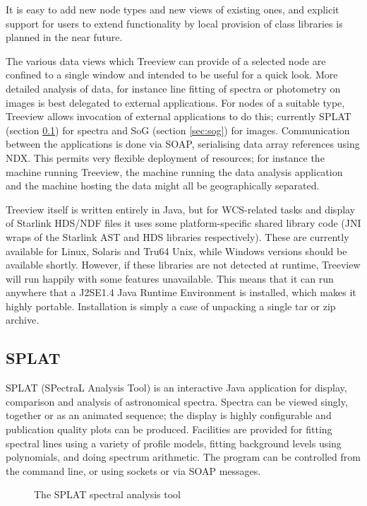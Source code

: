 It is easy to add new node types and new views of existing ones, 
and explicit support for users to extend functionality by local 
provision of class libraries is planned in the near future.

The various data views which Treeview can provide of a selected node
are confined to a single window and intended to be useful for a quick look.
More detailed analysis of data, for instance 
line fitting of spectra
or
photometry on images 
is best delegated to external applications.
For nodes of a suitable type, Treeview allows invocation of 
external applications to do this; currently 
SPLAT (section \ref{sec:splat}) for spectra
and
SoG (section \ref{sec:sog}) for images.
Communication between the applications is done via SOAP, 
serialising data array references using NDX.
This permits very flexible deployment of resources; for instance the 
machine running Treeview, the machine running the data analysis 
application and the machine hosting the data might all be 
geographically separated.

Treeview itself is written entirely in Java, but for WCS-related tasks
and display of Starlink HDS/NDF files it uses some platform-specific 
shared library code (JNI wraps of the Starlink AST and HDS
libraries respectively).  These are currently available for 
Linux, Solaris and Tru64 Unix, while Windows versions should be
available shortly.
However, if these libraries 
are not detected at runtime, Treeview will run happily with some 
features unavailable.  This means that it can
run anywhere that a J2SE1.4 Java Runtime Environment is installed, 
which makes it highly portable.
Installation is simply a case of unpacking a single tar or zip archive.

\subsection{SPLAT}
\label{sec:splat}

SPLAT (SPectraL Analysis Tool) is an interactive Java application for 
display, comparison and analysis of astronomical spectra.
Spectra can be viewed singly, together or as an animated sequence;
the display is highly configurable and publication quality plots
can be produced.
Facilities are provided for fitting spectral lines using a
variety of profile models, 
fitting background levels using polynomials,
and doing spectrum arithmetic.
The program can be controlled from the command line, or using sockets or 
via SOAP messages.
\begin{figure}
\caption{The SPLAT spectral analysis tool}
\end{figure}

